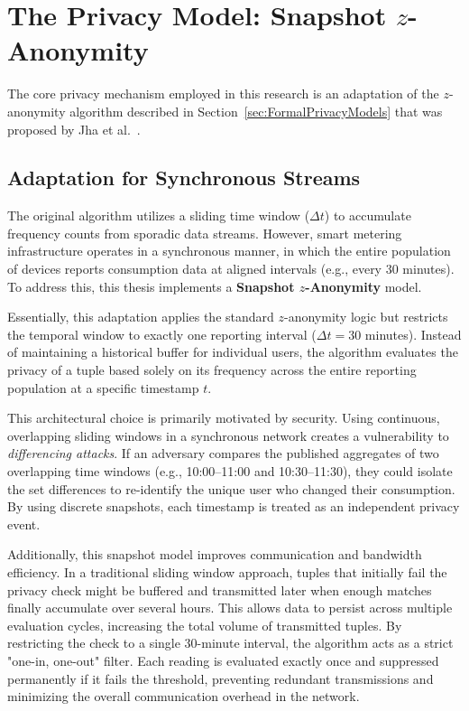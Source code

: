 \section{The Privacy Model: Snapshot \texorpdfstring{$z$}{z}-Anonymity}
\label{sec:zanonsnapshot}
The core privacy mechanism employed in this research is an adaptation of the $z$-anonymity algorithm described in Section~\ref{sec:FormalPrivacyModels} that was proposed by Jha et al.~\cite{zanonDataStreams}.

\subsection{Adaptation for Synchronous Streams}

The original algorithm utilizes a sliding time window ($\Delta t$) to accumulate frequency counts from sporadic data streams. However, smart metering infrastructure operates in a synchronous manner, in which the entire population of devices reports consumption data at aligned intervals (e.g., every 30 minutes). To address this, this thesis implements a \textbf{Snapshot $z$-Anonymity} model. 

Essentially, this adaptation applies the standard $z$-anonymity logic but restricts the temporal window to exactly one reporting interval ($\Delta t = 30$ minutes). Instead of maintaining a historical buffer for individual users, the algorithm evaluates the privacy of a tuple based solely on its frequency across the entire reporting population at a specific timestamp $t$. 

This architectural choice is primarily motivated by security. Using continuous, overlapping sliding windows in a synchronous network creates a vulnerability to \textit{differencing attacks}. If an adversary compares the published aggregates of two overlapping time windows (e.g., 10:00--11:00 and 10:30--11:30), they could isolate the set differences to re-identify the unique user who changed their consumption. By using discrete snapshots, each timestamp is treated as an independent privacy event.

Additionally, this snapshot model improves communication and bandwidth efficiency. In a traditional sliding window approach, tuples that initially fail the privacy check might be buffered and transmitted later when enough matches finally accumulate over several hours. This allows data to persist across multiple evaluation cycles, increasing the total volume of transmitted tuples. By restricting the check to a single 30-minute interval, the algorithm acts as a strict "one-in, one-out" filter. Each reading is evaluated exactly once and suppressed permanently if it fails the threshold, preventing redundant transmissions and minimizing the overall communication overhead in the network.


